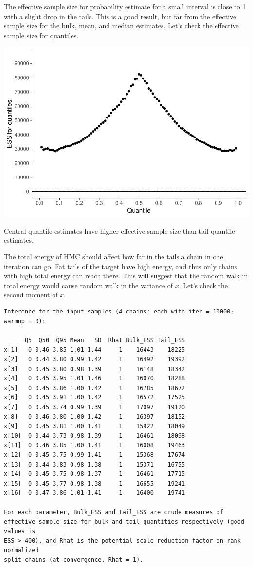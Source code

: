 \documentclass[american,]{article}
\begin{document}
The effective sample size for probability estimate for a small interval
is close to 1 with a slight drop in the tails. This is a good result,
but far from the effective sample size for the bulk, mean, and median
estimates. Let's check the effective sample size for quantiles.

\includegraphics{graphics/quantile-ess-fit-n-1.pdf}

Central quantile estimates have higher effective sample size than tail
quantile estimates.

The total energy of HMC should affect how far in the tails a chain in
one iteration can go. Fat tails of the target have high energy, and thus
only chains with high total energy can reach there. This will suggest
that the random walk in total energy would cause random walk in the
variance of \(x\). Let's check the second moment of \(x\).

\begin{verbatim}
Inference for the input samples (4 chains: each with iter = 10000; warmup = 0):

      Q5  Q50  Q95 Mean   SD  Rhat Bulk_ESS Tail_ESS
x[1]   0 0.46 3.85 1.01 1.44     1    16443    18225
x[2]   0 0.44 3.80 0.99 1.42     1    16492    19392
x[3]   0 0.45 3.80 0.98 1.39     1    16148    18342
x[4]   0 0.45 3.95 1.01 1.46     1    16070    18288
x[5]   0 0.45 3.86 1.00 1.42     1    16785    18672
x[6]   0 0.45 3.91 1.00 1.42     1    16572    17525
x[7]   0 0.45 3.74 0.99 1.39     1    17097    19120
x[8]   0 0.46 3.80 1.00 1.42     1    16397    18152
x[9]   0 0.45 3.81 1.00 1.41     1    15922    18049
x[10]  0 0.44 3.73 0.98 1.39     1    16461    18098
x[11]  0 0.46 3.85 1.00 1.41     1    16008    19463
x[12]  0 0.45 3.75 0.99 1.41     1    15368    17674
x[13]  0 0.44 3.83 0.98 1.38     1    15371    16755
x[14]  0 0.45 3.75 0.98 1.37     1    16461    17715
x[15]  0 0.45 3.77 0.98 1.38     1    16655    19241
x[16]  0 0.47 3.86 1.01 1.41     1    16400    19741

For each parameter, Bulk_ESS and Tail_ESS are crude measures of 
effective sample size for bulk and tail quantities respectively (good values is 
ESS > 400), and Rhat is the potential scale reduction factor on rank normalized
split chains (at convergence, Rhat = 1).
\end{verbatim}
\end{document}
